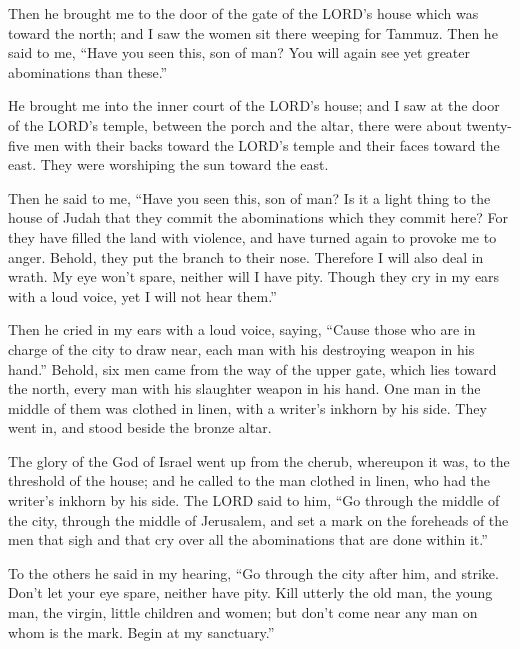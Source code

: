 \myverse{}Then he brought me to the door of the gate of the LORD’s house
which was toward the north; and I saw the women sit there weeping for Tammuz.
\myverse{}Then he said to me, “Have you seen this, son of man? You will again see yet
greater abominations than these.”

\myverse{}He brought me into the inner court of the LORD’s house; and I
saw at the door of the LORD’s temple, between the porch and the altar, there were about twenty-five men
with their backs toward the LORD’s temple and their faces toward the east. They were worshiping the sun
toward the east.

\myverse{}Then he said to me, “Have you seen this, son of man? Is it a
light thing to the house of Judah that they commit the abominations which they commit here? For they have
filled the land with violence, and have turned again to provoke me to anger. Behold, they put the branch
to their nose.
\myverse{}Therefore I will also deal in wrath. My eye won’t spare, neither will I have
pity. Though they cry in my ears with a loud voice, yet I will not hear them.”



\mychapter{} \myverse*{}Then he cried in my ears with a loud voice, saying, “Cause those
who are in charge of the city to draw near, each man with his destroying weapon in his hand.”
\myverse{}Behold, six men came from the way of the upper gate, which lies toward the north,
every man with his slaughter weapon in his hand. One man in the middle of them was clothed in linen, with
a writer’s inkhorn by his side. They went in, and stood beside the bronze altar.

\myverse{}The glory of the God of Israel went up from the cherub, whereupon
it was, to the threshold of the house; and he called to the man clothed in linen, who had the writer’s
inkhorn by his side.
\myverse{}The LORD said to him, “Go through the middle of the city, through the middle
of Jerusalem, and set a mark on the foreheads of the men that sigh and that cry over all the abominations
that are done within it.”

\myverse{}To the others he said in my hearing, “Go through the city after
him, and strike. Don’t let your eye spare, neither have pity.
\myverse{}Kill utterly the old man, the young man, the virgin, little children and women;
but don’t come near any man on whom is the mark. Begin at my sanctuary.”

